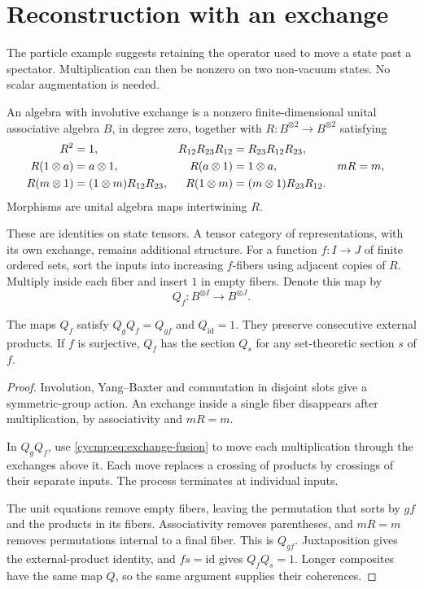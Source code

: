 \section{Reconstruction with an exchange}
\label{cycmp:sec:exchange}

The particle example suggests retaining the operator used to move a
state past a spectator. Multiplication can then be nonzero on two
non-vacuum states. No scalar augmentation is needed.

\begin{definition}\label{cycmp:def:exchange}
An algebra with involutive exchange is a nonzero finite-dimensional
unital associative algebra $B$, in degree zero, together with
$R:B^{\otimes2}\to B^{\otimes2}$ satisfying
\begin{align}
 R^2&=1,&R_{12}R_{23}R_{12}&=R_{23}R_{12}R_{23},\notag\\
 R(1\otimes a)&=a\otimes1,&R(a\otimes1)&=1\otimes a,
       &mR&=m,\label{cycmp:eq:exchange-unit}\\
 R(m\otimes1)&=(1\otimes m)R_{12}R_{23},&
 R(1\otimes m)&=(m\otimes1)R_{23}R_{12}.\label{cycmp:eq:exchange-fusion}
\end{align}
Morphisms are unital algebra maps intertwining $R$.
\end{definition}

These are identities on state tensors. A tensor category of
representations, with its own exchange, remains additional structure.
For a function $f:I\to J$ of finite ordered sets, sort the inputs
into increasing $f$-fibers using adjacent copies of $R$.
Multiply inside each fiber and insert $1$ in empty fibers.
Denote this map by
\[
 Q_f:B^{\otimes I}\longrightarrow B^{\otimes J}.
\]

\begin{lemma}\label{cycmp:lem:fusion}
The maps $Q_f$ satisfy $Q_gQ_f=Q_{gf}$ and $Q_{\mathrm{id}}=1$.
They preserve consecutive external products. If $f$ is surjective,
$Q_f$ has the section $Q_s$ for any set-theoretic section $s$ of $f$.
\end{lemma}

\begin{proof}
Involution, Yang--Baxter and commutation in disjoint slots give a
symmetric-group action. An exchange inside a single fiber disappears
after multiplication, by associativity and $mR=m$.

In $Q_gQ_f$, use \eqref{cycmp:eq:exchange-fusion} to move each
multiplication through the exchanges above it. Each move replaces a
crossing of products by crossings of their separate inputs. The
process terminates at individual inputs.

The unit equations remove
empty fibers, leaving the permutation that sorts by $gf$ and the
products in its fibers. Associativity removes parentheses, and
$mR=m$ removes permutations internal to a final fiber. This is
$Q_{gf}$. Juxtaposition gives the external-product identity, and
$fs=\mathrm{id}$ gives $Q_fQ_s=1$. Longer composites have the same
map $Q$, so the same argument supplies their coherences.
\end{proof}

